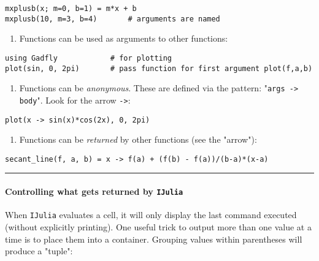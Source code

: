 \documentclass[12pt]{article}
\begin{document}
\begin{verbatim}
mxplusb(x; m=0, b=1) = m*x + b
mxplusb(10, m=3, b=4)       # arguments are named
\end{verbatim}
\begin{enumerate}
\def\labelenumi{\arabic{enumi})}
\setcounter{enumi}{4}
\itemsep1pt\parskip0pt
\item
  Functions can be used as arguments to other functions:
\end{enumerate}



\begin{verbatim}
using Gadfly            # for plotting
plot(sin, 0, 2pi)       # pass function for first argument plot(f,a,b)
\end{verbatim}
\begin{enumerate}
\def\labelenumi{\arabic{enumi})}
\setcounter{enumi}{5}
\itemsep1pt\parskip0pt
\item
  Functions can be \emph{anonymous}. These are defined via the pattern:
  "\texttt{args -\textgreater{} body}". Look for the arrow
  \texttt{-\textgreater{}}:
\end{enumerate}



\begin{verbatim}
plot(x -> sin(x)*cos(2x), 0, 2pi)
\end{verbatim}
\begin{enumerate}
\def\labelenumi{\arabic{enumi})}
\setcounter{enumi}{6}
\itemsep1pt\parskip0pt
\item
  Functions can be \emph{returned} by other functions (see the "arrow"):
\end{enumerate}



\begin{verbatim}
secant_line(f, a, b) = x -> f(a) + (f(b) - f(a))/(b-a)*(x-a)
\end{verbatim}
\begin{center}\rule{3in}{0.4pt}\end{center}

\paragraph{Controlling what gets returned by \texttt{IJulia}}

When \texttt{IJulia} evaluates a cell, it will only display the last
command executed (without explicitly printing). One useful trick to
output more than one value at a time is to place them into a container.
Grouping values within parentheses will produce a "tuple":
\end{document}
